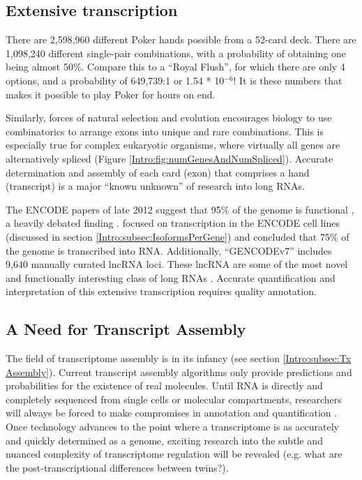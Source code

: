   \subsection{Extensive transcription}
    \label{Disc:subsec:Pervasive Tx}

    There are 2,598,960 different Poker hands possible from a 52-card deck. There are 1,098,240 different single-pair combinations, with a probability of obtaining one being almost 50\%. Compare this to a ``Royal Flush'', for which there are only 4 options, and a probability of 649,739:1 or 1.54 * 10$^{-6}$! It is these numbers that makes it possible to play Poker for hours on end. 

    Similarly, forces of natural selection and evolution encourages biology to use combinatorics to arrange exons into unique and rare combinations. This is especially true for complex eukaryotic organisms, where virtually all genes are alternatively spliced (Figure \ref{Intro:fig:numGenesAndNumSpliced}). Accurate determination and assembly of each card (exon) that comprises a hand (transcript) is a major ``known unknown'' \citep{Rumsfeld2011} of research into long RNAs.

    The ENCODE papers of late 2012 suggest that 95\% of the genome is functional \citep{Dunham2012}, a heavily debated finding \citep{Graur2013,Bhattacharjee2014}. \citet{Djebali2012} focused on transcription in the ENCODE cell lines (discussed in section \ref{Intro:subsec:IsoformsPerGene}) and concluded that 75\% of the genome is transcribed into RNA. Additionally, ``GENCODEv7'' includes 9,640 manually curated lncRNA loci. These lncRNA are some of the most novel and functionally interesting class of long RNAs \citep{Derrien2012,Pauli2011}. Accurate quantification and interpretation of this extensive transcription requires quality annotation.

  \subsection{A Need for Transcript Assembly}
    \label{Disc:subsec:need for Tx assembly}

    The field of transcriptome assembly is in its infancy (see section \ref{Intro:subsec:Tx Assembly}). Current transcript assembly algorithms only provide predictions and probabilities for the existence of real molecules. Until RNA is directly and completely sequenced from single cells or molecular compartments, researchers will always be forced to make compromises in annotation and quantification \citep{Ozsolak2010,Steijger2013}. Once technology advances to the point where a transcriptome is as accurately and quickly determined as a genome, exciting research into the subtle and nuanced complexity of transcriptome regulation will be revealed (e.g. what are the post-transcriptional differences between twins?).

